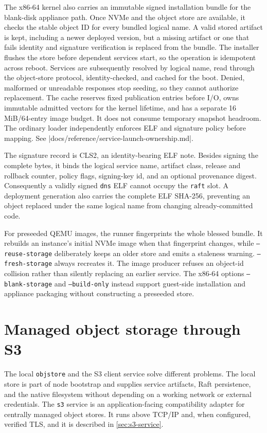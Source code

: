 The x86-64 kernel also carries an immutable signed installation bundle for the
blank-disk appliance path. Once NVMe and the object store are available, it
checks the stable object ID for every bundled logical name. A valid stored
artifact is kept, including a newer deployed version, but a missing artifact
or one that fails identity and signature verification is replaced from the
bundle. The installer flushes the store before dependent services start, so
the operation is idempotent across reboot. Services are subsequently resolved
by logical name, read through the object-store protocol, identity-checked, and
cached for the boot. Denied, malformed or unreadable responses stop seeding, so
they cannot authorize replacement. The cache reserves fixed publication entries
before I/O, owns immutable admitted vectors for the kernel lifetime, and has a
separate 16 MiB/64-entry image budget. It does not consume temporary snapshot
headroom. The ordinary loader independently enforces ELF and signature policy
before mapping. See
\repofile|docs/reference/service-launch-ownership.md|.

The signature record is CLS2, an identity-bearing ELF note. Besides signing
the complete bytes, it binds the logical service name, artifact class, release
and rollback counter, policy flags, signing-key id, and an optional provenance
digest. Consequently a validly signed \texttt{dns} ELF cannot occupy the
\texttt{raft} slot. A deployment generation also carries the complete ELF
SHA-256, preventing an object replaced under the same logical name from
changing already-committed code.

For preseeded QEMU images, the runner fingerprints the whole blessed bundle.
It rebuilds an instance's initial NVMe image when that fingerprint changes,
while \texttt{--reuse-storage} deliberately keeps an older store and emits a
staleness warning. \texttt{--fresh-storage} always recreates it. The image
producer refuses an object-id collision rather than silently replacing an
earlier service. The x86-64 options \texttt{--blank-storage} and
\texttt{--build-only} instead support guest-side installation and appliance
packaging without constructing a preseeded store.

\section{Managed object storage through S3}

The local \texttt{objstore} and the S3 client service solve different
problems. The local store is part of node bootstrap and supplies service
artifacts, Raft persistence, and the native filesystem without depending on a
working network or external credentials. The \texttt{s3} service is an
application-facing compatibility adapter for centrally managed object stores.
It runs above TCP/IP and, when configured, verified TLS, and it is described in
\autoref{sec:s3-service}.

